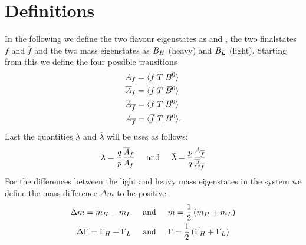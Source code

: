 \section{Definitions}

In the following we define the two flavour eigenstates as \Bz and \Bzb, the two finalstates $f$ and $\overline{f}$ and the two mass eigenstates as
$B_H$ (heavy) and $B_L$ (light). Starting from this we define the four possible transitions
\begin{align}
   A_f &= \langle f|T|B^0\rangle\\
   \overline{A}_f &= \langle f|T|\kern 0.18em\overline{\kern -0.18em B}{}^0\rangle \\
   \overline{A}_{\overline{f}} &= \langle \overline{f}|T|\kern 0.18em\overline{\kern -0.18em B}{}^0\rangle\\
   A_{\overline{f}} &= \langle \overline{f}|T|B^0\rangle.
\end{align}
Last the quantities $\lambda$ and $\overline{\lambda}$ will be uses as follows:
\begin{equation}
    \lambda = \frac{q}{p}\frac{\overline{A}_f}{A_f} \hspace{0.5cm} \text{and} \hspace{0.5cm} \overline{\lambda}
    = \frac{p}{q}\frac{A_{\overline{f}}}{\overline{A}_{\overline{f}}}
\end{equation}
For the differences between the light and heavy mass eigenstates in the \B system we define the mass difference $\Delta m$ to be positive:
\begin{align}
    \Delta m = m_H - m_L \hspace{0.5cm} &\text{and} \hspace{0.5cm} m = \frac{1}{2}\left(m_H+ m_L\right)\label{eq:defmassdiff}\\
    \Delta \Gamma = \Gamma_H - \Gamma_L \hspace{0.5cm} &\text{and} \hspace{0.5cm} \Gamma = \frac{1}{2}\left(\Gamma_H + \Gamma_L\right)\label{eq:defdecratewidth}
\end{align}
